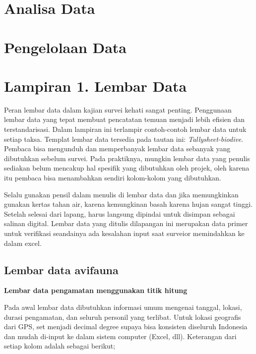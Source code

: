 \documentclass[
]{book}
\begin{document}
\hypertarget{analisa-data}{%
\chapter*{Analisa Data}\label{analisa-data}}

\hypertarget{pengelolaan-data}{%
\chapter*{Pengelolaan Data}\label{pengelolaan-data}}

\hypertarget{lampiran-1.-lembar-data}{%
\chapter*{Lampiran 1. Lembar Data}\label{lampiran-1.-lembar-data}}

Peran lembar data dalam kajian survei kehati sangat penting. Penggunaan lembar data yang tepat membuat pencatatan temuan menjadi lebih efisien dan terstandarisasi. Dalam lampiran ini terlampir contoh-contoh lembar data untuk setiap taksa. Templat lembar data tersedia pada tautan ini: \emph{Tallysheet-biodive}. Pembaca bisa mengunduh dan memperbanyak lembar data sebanyak yang dibutuhkan sebelum survei. Pada praktiknya, mungkin lembar data yang penulis sediakan belum mencakup hal spesifik yang dibutuhkan oleh projek, oleh karena itu pembaca bisa menambahkan sendiri kolom-kolom yang dibutuhkan.

Selalu gunakan pensil dalam menulis di lembar data dan jika memungkinkan gunakan kertas tahan air, karena kemungkinan basah karena hujan sangat tinggi. Setelah selesai dari lapang, harus langsung dipindai untuk disimpan sebagai salinan digital. Lembar data yang ditulis dilapangan ini merupakan data primer untuk verifikasi seandainya ada kesalahan input saat surveior memindahkan ke dalam excel.

\hypertarget{lembar-data-avifauna}{%
\section*{Lembar data avifauna}\label{lembar-data-avifauna}}

\textbf{Lembar data pengamatan menggunakan titik hitung}

Pada awal lembar data dibutuhkan informasi umum mengenai tanggal, lokasi, durasi pengamatan, dan seluruh personil yang terlibat. Untuk lokasi geografis dari GPS, set menjadi decimal degree supaya bisa konsisten diseluruh Indonesia dan mudah di-input ke dalam sistem computer (Excel, dll). Keterangan dari setiap kolom adalah sebagai berikut;
\end{document}
